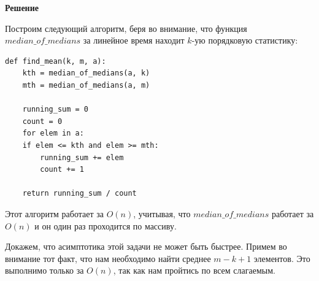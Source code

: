 \documentclass{article}
\begin{document}
\medskip

\textbf{Решение}

Построим следующий алгоритм, беря во внимание, что функция
$median\_of\_medians$ за линейное время находит $k$-ую
порядковую статистику:

\begin{lstlisting}
def find_mean(k, m, a):
    kth = median_of_medians(a, k)
    mth = median_of_medians(a, m)
    
    running_sum = 0
    count = 0
    for elem in a:
    if elem <= kth and elem >= mth:
        running_sum += elem
        count += 1

    return running_sum / count
\end{lstlisting}

Этот алгоритм работает за $O(n)$, учитывая, что
$median\_of\_medians$ работает за $O(n)$ и он один раз
проходится по массиву.

Докажем, что асимптотика этой задачи не может быть быстрее.
Примем во внимание тот факт, что нам необходимо найти
среднее $m - k + 1$ элементов. Это выполнимо только за
$O(n)$, так как нам пройтись по всем слагаемым.
\end{document}
